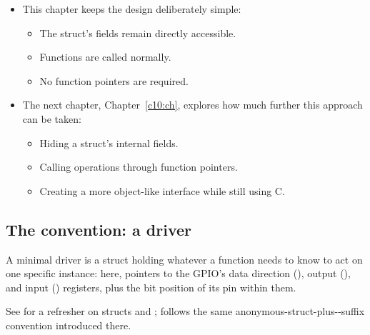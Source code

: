 \begin{itemize}
\begin{itemize}
      accept a pointer to that data.
  \end{itemize}
  \item This chapter keeps the design deliberately simple:
  \begin{itemize}
    \item The struct's fields remain directly accessible.
    \item Functions are called normally.
    \item No function pointers are required.
  \end{itemize}
  \item The next chapter, Chapter~\ref{c10:ch}, explores how much further this approach can be
    taken:
  \begin{itemize}
    \item Hiding a struct's internal fields.
    \item Calling operations through function pointers.
    \item Creating a more object-like interface while still using C.
  \end{itemize}
\end{itemize}

\subsection{The  convention: a  driver}
\label{c9:a:2}
A minimal driver is a struct holding whatever a function needs to know to act on one specific
instance: here, pointers to the GPIO's data direction (), output (), and
input () registers, plus the bit position of its pin within them.

See  for a refresher on structs and ;  follows the same
anonymous-struct-plus--suffix convention introduced there.

